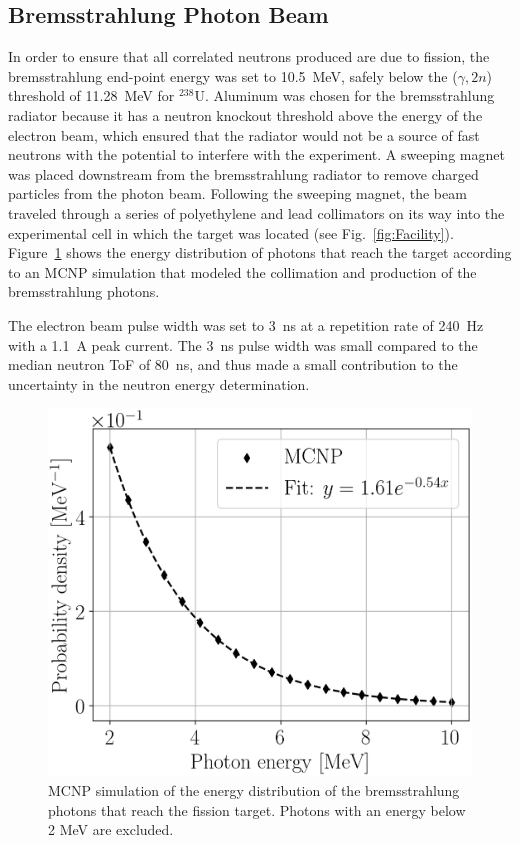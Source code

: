 \subsection{Bremsstrahlung Photon Beam}
\label{beam}
In order to ensure that all correlated neutrons produced are due to fission, the bremsstrahlung end-point energy was set to 10.5~MeV, safely below the ($\gamma, 2n$) threshold of 11.28~MeV for $^{238}$U.
Aluminum was chosen for the bremsstrahlung radiator because it has a neutron knockout threshold above the energy of the electron beam, which ensured that the radiator would not be a source of fast neutrons with the potential to interfere with the experiment.
A sweeping magnet was placed downstream from the bremsstrahlung radiator to remove charged particles from the photon beam.
Following the sweeping magnet, the beam traveled through a series of polyethylene and lead collimators on its way into the experimental cell in which the target was located (see Fig.~\ref{fig:Facility}).
Figure~\ref{fig:BremDist} shows the energy distribution of photons that reach the target according to an MCNP simulation that modeled the collimation and production of the bremsstrahlung photons.

The electron beam pulse width was set to 3~ns at a repetition rate of 240~Hz with a 1.1~A peak current.
The 3~ns pulse width was small compared to the median neutron ToF of 80~ns, and thus made a small contribution to the uncertainty in the neutron energy determination.
\begin{figure}[h]
\centering
\includegraphics[width=\FigBremDistSize\textwidth]{MCNPBremDistribution.png}
\caption{MCNP simulation of the energy distribution of the bremsstrahlung photons that reach the fission target. Photons with an energy below 2 MeV are excluded.}
\label{fig:BremDist}
\end{figure}

